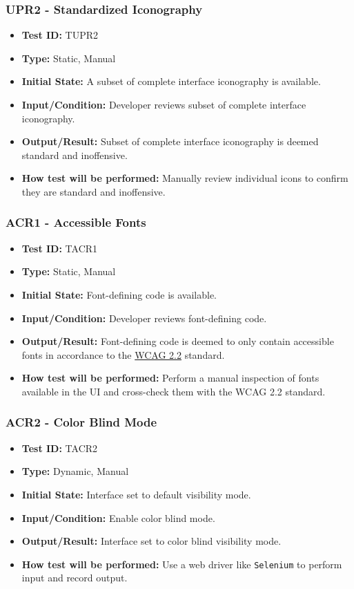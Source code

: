 \documentclass[12pt, titlepage]{article}
\begin{document}
\subsubsection{UPR2 - Standardized Iconography}
\begin{itemize}
    \item \textbf{Test ID:} TUPR2
    \item \textbf{Type:} Static, Manual
    \item \textbf{Initial State:} A subset of complete interface iconography is available.
    \item \textbf{Input/Condition:} Developer reviews subset of complete interface iconography.
    \item \textbf{Output/Result:} Subset of complete interface iconography is deemed standard and inoffensive.
    \item \textbf{How test will be performed:} Manually review individual icons to confirm they are standard and inoffensive.
\end{itemize}

\subsubsection{ACR1 - Accessible Fonts}
\begin{itemize}
    \item \textbf{Test ID:} TACR1
    \item \textbf{Type:} Static, Manual
    \item \textbf{Initial State:} Font-defining code is available.
    \item \textbf{Input/Condition:} Developer reviews font-defining code.
    \item \textbf{Output/Result:} Font-defining code is deemed to only contain accessible fonts in accordance to the \href{https://www.w3.org/TR/2023/REC-WCAG22-20231005/}{WCAG 2.2} standard.
    \item \textbf{How test will be performed:} Perform a manual inspection of fonts available in the UI and cross-check them with the WCAG 2.2 standard.
\end{itemize}

\subsubsection{ACR2 - Color Blind Mode}
\begin{itemize}
    \item \textbf{Test ID:} TACR2
    \item \textbf{Type:} Dynamic, Manual
    \item \textbf{Initial State:} Interface set to default visibility mode.
    \item \textbf{Input/Condition:} Enable color blind mode.
    \item \textbf{Output/Result:} Interface set to color blind visibility mode.
    \item \textbf{How test will be performed:} Use a web driver like \texttt{Selenium} to perform input and record output.
\end{itemize}
\end{document}
